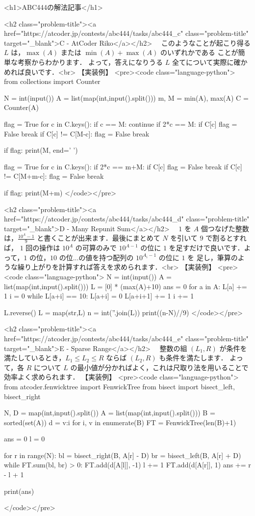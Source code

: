 <h1>ABC444の解法記事</h1>

<h2 class="problem-title"><a href="https://atcoder.jp/contests/abc444/tasks/abc444_c" class="problem-title" target="_blank">C - AtCoder Riko</a></h2>
　このようなことが起こり得る $L$ は，$\max(A)$ または $\min(A) + \max(A)$ のいずれかである
ことが簡単な考察からわかります．
よって，答えになりうる $L$ 全てについて実際に確かめれば良いです．<br>
【実装例】
<pre><code class="language-python">
from collections import Counter

N = int(input())
A = list(map(int,input().split()))
m, M = min(A), max(A)
C = Counter(A)

flag = True
for c in C.keys():
    if c == M:
        continue
    if 2*c == M:
        if C[c] %
            flag = False
            break
    if C[c] != C[M-c]:
        flag = False
        break

if flag:
    print(M, end=' ')

flag = True
for c in C.keys():
    if 2*c == m+M:
        if C[c] %
            flag = False
            break
    if C[c] != C[M+m-c]:
        flag = False
        break

if flag:
    print(M+m)
</code></pre>

<h2 class="problem-title"><a href="https://atcoder.jp/contests/abc444/tasks/abc444_d" class="problem-title" target="_blank">D - Many Repunit Sum</a></h2>
　$1$ を $A$ 個つなげた整数は，$\frac{10^A-1}{9}$ と書くことが出来ます．最後にまとめて $N$ を引いて $9$ で割るとすれば，
$1$ 回の操作は $10^A$ の可算のみで $10^{A-1}$ の位に $1$ を足すだけで良いです．よって，$1$ の位，$10$ の位...の値を持つ配列の $10^{A_i-1}$ の位に $1$ を
足し，筆算のような繰り上がりを計算すれば答えを求められます．<br>
【実装例】
<pre><code class="language-python">
N = int(input())
A = list(map(int,input().split()))
L = [0] * (max(A)+10)
ans = 0
for a in A:
    L[a] += 1
    i = 0
    while L[a+i] == 10:
        L[a+i] = 0
        L[a+i+1] += 1
        i += 1

L.reverse()
L = map(str,L)
n = int(''.join(L))
print((n-N)//9)
</code></pre>

<h2 class="problem-title"><a href="https://atcoder.jp/contests/abc444/tasks/abc444_e" class="problem-title" target="_blank">E - Sparse Range</a></h2>
　整数の組 $(L_1, R)$ が条件を満たしているとき，$L_1 \le L_2 \le R$ ならば $(L_2, R)$ も条件を満たします．
よって，各 $R$ について $L$ の最小値が分かればよく，これは尺取り法を用いることで効率よく求められます．
【実装例】
<pre><code class="language-python">
from atcoder.fenwicktree import FenwickTree
from bisect import bisect_left, bisect_right

N, D = map(int,input().split())
A = list(map(int,input().split()))
B = sorted(set(A))
d = {v:i for i, v in enumerate(B)}
FT = FenwickTree(len(B)+1)

ans = 0
l = 0

for r in range(N):
    bl = bisect_right(B, A[r] - D)
    br = bisect_left(B, A[r] + D)
    while FT.sum(bl, br) > 0:
        FT.add(d[A[l]], -1)
        l += 1
    FT.add(d[A[r]], 1)
    ans += r - l + 1

print(ans)

</code></pre>
